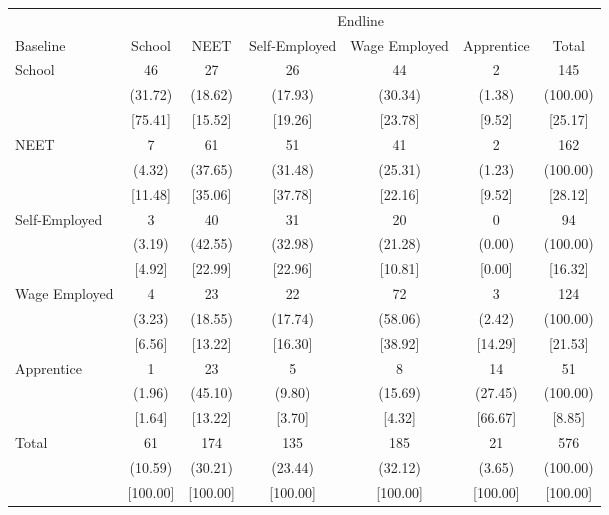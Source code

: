 {
\def\sym#1{\ifmmode^{#1}\else\(^{#1}\)\fi}
\begin{tabular}{l*{6}{c}}
\hline\hline
            &\multicolumn{6}{c}{Endline}                                                  \\
Baseline    &      School&        NEET&Self-Employed&Wage Employed&  Apprentice&       Total\\
\hline
School      &          46&          27&          26&          44&           2&         145\\
            &     (31.72)&     (18.62)&     (17.93)&     (30.34)&      (1.38)&    (100.00)\\
            &     [75.41]&     [15.52]&     [19.26]&     [23.78]&      [9.52]&     [25.17]\\
NEET        &           7&          61&          51&          41&           2&         162\\
            &      (4.32)&     (37.65)&     (31.48)&     (25.31)&      (1.23)&    (100.00)\\
            &     [11.48]&     [35.06]&     [37.78]&     [22.16]&      [9.52]&     [28.12]\\
Self-Employed&           3&          40&          31&          20&           0&          94\\
            &      (3.19)&     (42.55)&     (32.98)&     (21.28)&      (0.00)&    (100.00)\\
            &      [4.92]&     [22.99]&     [22.96]&     [10.81]&      [0.00]&     [16.32]\\
Wage Employed&           4&          23&          22&          72&           3&         124\\
            &      (3.23)&     (18.55)&     (17.74)&     (58.06)&      (2.42)&    (100.00)\\
            &      [6.56]&     [13.22]&     [16.30]&     [38.92]&     [14.29]&     [21.53]\\
Apprentice  &           1&          23&           5&           8&          14&          51\\
            &      (1.96)&     (45.10)&      (9.80)&     (15.69)&     (27.45)&    (100.00)\\
            &      [1.64]&     [13.22]&      [3.70]&      [4.32]&     [66.67]&      [8.85]\\
Total       &          61&         174&         135&         185&          21&         576\\
            &     (10.59)&     (30.21)&     (23.44)&     (32.12)&      (3.65)&    (100.00)\\
            &    [100.00]&    [100.00]&    [100.00]&    [100.00]&    [100.00]&    [100.00]\\
\hline\hline
\end{tabular}
}
